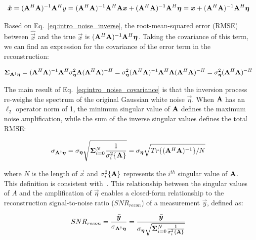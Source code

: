 \begin{equation}\label{eq:intro_noise_inverse}
        \hat{\bm{\bm{x}}} = (\mathbf{A}^H \mathbf{A})^{-1} \mathbf{A}^H y = (\mathbf{A}^H \mathbf{A})^{-1} \mathbf{A}^H \mathbf{A} \bm{x} + (\mathbf{A}^H \mathbf{A})^{-1} \mathbf{A}^H \bm{\eta} = \bm{x} + (\mathbf{A}^H \mathbf{A})^{-1} \mathbf{A}^H \bm{\eta}
\end{equation}

Based on Eq.~\ref{eq:intro_noise_inverse}, the root-mean-squared error (RMSE) between $\hat{\vec{x}}$ and the true $\vec{x}$ is $(\mathbf{A}^H \mathbf{A})^{-1} \mathbf{A}^H \bm{\eta}$. Taking the covariance of this term, we can find an expression for the covariance of the error term in the reconstruction:

\begin{equation}\label{eq:intro_noise_covariance}
    \mathbf{\Sigma}_{\mathbf{A}^{\dagger}\bm{\eta}} = (\mathbf{A}^H \mathbf{A})^{-1} \mathbf{A}^H \sigma_{\bm{\eta}}^2 \mathbf{A} (\mathbf{A}^H \mathbf{A}) ^{-H} = \sigma_{\bm{\eta}}^2 (\mathbf{A}^H \mathbf{A})^{-1} \mathbf{A}^H  \mathbf{A} (\mathbf{A}^H \mathbf{A}) ^{-H} = \sigma_{\bm{\eta}}^2 (\mathbf{A}^H \mathbf{A}) ^{-H}
\end{equation}

The main result of Eq.~\ref{eq:intro_noise_covariance} is that the inversion process re-weighs the spectrum of the original Gaussian white noise $\vec{\eta}$. When $\mathbf{A}$ has an $\ell_2$ operator norm of 1, the minimum singular value of $\mathbf{A}$ defines the maximum noise amplification, while the sum of the inverse singular values defines the total RMSE:

\begin{equation}\label{eq:intro_noise_amplification}
    \sigma_{\mathbf{A}^{\dagger}\bm{\eta}} = \sigma_{\bm{\eta}} \sqrt{\mathbf{\Sigma}_{i=0}^N{\frac{1}{\sigma_i^2\{\mathbf{A}\}}}} = \sigma_{\bm{\eta}} \sqrt{Tr\{(\mathbf{A}^H \mathbf{A})^{-1}\} / N}
\end{equation}

\noindent where $N$ is the length of $\vec{x}$ and $\sigma_i^2 \{\mathbf{A}\}$ represents the $i^{th}$ singular value of $\mathbf{A}$. This definition is consistent with~\cite{agrawal2009optimal}. This relationship between the singular values of $A$ and the amplification of $\vec{\eta}$ enables a closed-form relationship to the reconstruction signal-to-noise ratio ($SNR_{recon}$) of a measurement $\vec{y}$, defined as:

\begin{equation}\label{eq:intro_snr_recon}
SNR_{recon} = \frac{\bar{\bm{y}}}{\sigma_{\mathbf{A}^{\dagger}\bm{\eta}}} = \frac{\bar{\bm{y}}}{\sigma_{\bm{\eta}} \sqrt{\mathbf{\Sigma}_{i=0}^N{\frac{1}{\sigma_i^2\{\mathbf{A}\}}}}}
\end{equation}

